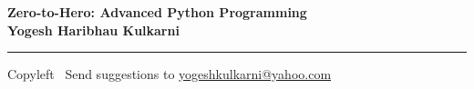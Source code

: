 
\graphicspath{{images/}}

\footnotesize


\begin{center}
\Large{\textbf{Zero-to-Hero: Advanced Python Programming\\ Yogesh Haribhau Kulkarni}}  
\end{center}

\begin{multicols}{2}
	
\end{multicols}

\rule{\linewidth}{0.25pt}
\scriptsize
Copyleft \textcopyleft\  Send suggestions to 
\href{http://www.yogeshkulkarni.com}{yogeshkulkarni@yahoo.com}


